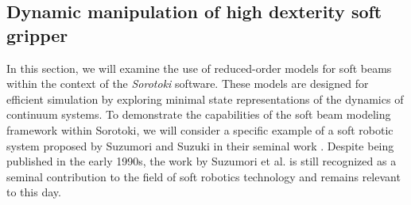 \subsection{Dynamic manipulation of high dexterity soft gripper}
\label{sec:C5:suzumori_gripper}
In this section, we will examine the use of reduced-order models for soft beams within the context of the \textit{Sorotoki} software. These models are designed for efficient simulation by exploring minimal state representations of the dynamics of continuum systems. To demonstrate the capabilities of the soft beam modeling framework within Sorotoki, we will consider a specific example of a soft robotic system proposed by Suzumori and Suzuki in their seminal work \cite{Suzumori1991,Suzumori1992}. Despite being published in the early 1990s, the work by Suzumori et al. is still recognized as a seminal contribution to the field of soft robotics technology and remains relevant to this day.

